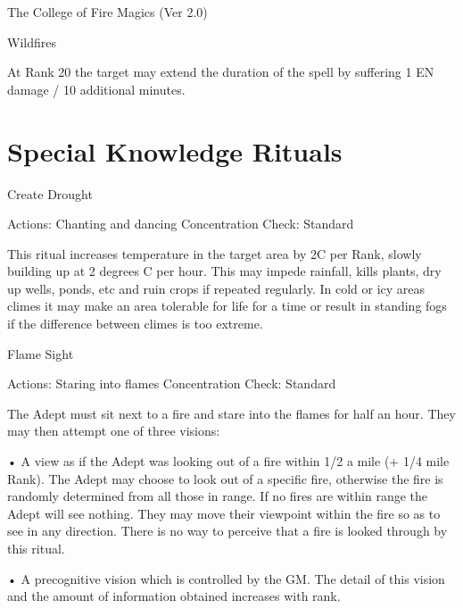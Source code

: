 \begin{Chapter}{The College of Fire Magics (Ver 2.0)}
\begin{spell}[S-14]{Wildfires }
\begin{effects}
At  Rank  20  the  target  may  extend  the  duration  of 
the spell by suffering 1 EN damage / 10 additional 
minutes. 


\end{effects}
\end{spell}

\section{Special Knowledge Rituals}

\begin{ritual}[R-1]{Create Drought }

Actions: Chanting and dancing 
Concentration Check: Standard 
\begin{effects}
 This  ritual  increases  temperature  in  the 
target area by 2C per Rank, slowly building up at 2 
degrees C per hour. This may impede rainfall, kills 
plants,  dry  up  wells,  ponds,  etc  and  ruin  crops  if 
repeated  regularly.  In  cold  or  icy  areas  climes  it 
may  make  an  area  tolerable  for  life  for  a  time  or 
result  in  standing  fogs  if  the  difference  between 
climes is too extreme. 

\end{effects}
\end{ritual}

\begin{ritual}[R-2]{Flame Sight }

Actions: Staring into flames 
Concentration Check: Standard 
\begin{effects}
The Adept must sit next to a fire and stare 
into  the  flames  for  half  an  hour.  They  may  then 
attempt one of three visions:  

•  A view as if the Adept was looking out of  a fire 
within  1/2  a  mile  (+  1/4  mile  Rank).  The  Adept 
may choose to look out of a specific fire, otherwise 
the  fire  is  randomly  determined  from  all  those  in 
range.  If  no  fires  are  within  range  the  Adept  will 
see  nothing.  They  may  move  their  viewpoint 
within the fire so as to see in any direction. There 
is no way to perceive that a fire is looked through 
by this ritual.  

•  A  precognitive  vision  which is  controlled  by  the 
GM.  The  detail  of  this  vision  and  the  amount  of 
information obtained increases with rank.  


\end{effects}
\end{ritual}
\end{Chapter}
